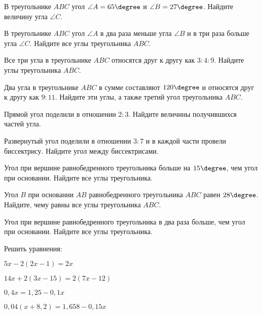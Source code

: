 %
\begin{class}[number=4]
	\begin{listofex}
		\item В треугольнике \( ABC \) угол \( \angle A = 65\degree \) и \( \angle B = 27\degree \). Найдите величину угла \( \angle C \).
		\item В треугольнике \( ABC \) угол \( \angle A \) в два раза меньше угла \( \angle B \) и в три раза больше угла \( \angle C \). Найдите все углы треугольника \( ABC \).
		\item Все три угла в треугольнике \( ABC \) относятся друг к другу как \( 3:4:9 \). Найдите углы треугольника \( ABC \).
		\item Два угла в треугольнике \( ABC \) в сумме составляют \( 120\degree \) и относятся друг к другу как \( 9:11 \). Найдите эти углы, а также третий угол треугольника \( ABC \).
		\item Прямой угол поделили в отношении \( 2:3 \). Найдите величины получившихся частей угла.
		\item Развернутый угол поделили в отношении \( 3:7 \) и в каждой части провели биссектрису. Найдите угол между биссектрисами.
		\item Угол при вершине равнобедренного треугольника больше на \(15 \degree\), чем угол при основании. Найдите все углы треугольника.
		\item Угол \( B \) при основании \( AB \) равнобедренного треугольника \( ABC \) равен \( 28\degree \). Найдите, чему равны все углы треугольника \( ABC \).
		\item Угол при вершине равнобедренного треугольника в два раза больше, чем угол при основании. Найдите все углы треугольника.
		\item Решить уравнения:
		\begin{enumcols}[itemcolumns=2]
			\item \( 5x-2(2x-1)=2x \)
			\item \( 14x+2(3x-15)=2(7x-12) \)
			\item \( 0,4x=1,25-0,1x \)
			\item \( 0,04(x+8,2)=1,658-0,15x \)
		\end{enumcols}
	\end{listofex}
\end{class}
%
%
%
